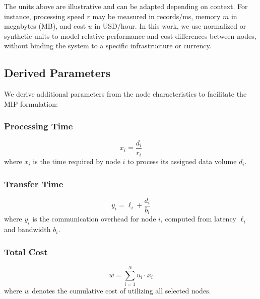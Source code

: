 \documentclass[]{interact}
\theoremstyle{plain}
\theoremstyle{definition}
\theoremstyle{remark}
\begin{document}
The units above are illustrative and can be adapted depending on context. For instance, processing speed $r$ may be measured in records/ms, memory $m$ in megabytes (MB), and cost $u$ in USD/hour. In this work, we use normalized or synthetic units to model relative performance and cost differences between nodes, without binding the system to a specific infrastructure or currency.

\subsection{Derived Parameters}
We derive additional parameters from the node characteristics to facilitate the MIP formulation:

\subsubsection{Processing Time}
\begin{equation}
    x_i = \frac{d_i}{r_i}
\end{equation}
where $x_i$ is the time required by node $i$ to process its assigned data volume $d_i$.

\subsubsection{Transfer Time}
\begin{equation}
    y_i = \ell_i + \frac{d_i}{b_i}
\end{equation}
where $y_i$ is the communication overhead for node $i$, computed from latency $\ell_i$ and bandwidth $b_i$.

\subsubsection{Total Cost}
\begin{equation}
    w = \sum_{i=1}^N u_i \cdot x_i
\end{equation}
where $w$ denotes the cumulative cost of utilizing all selected nodes.
\end{document}
